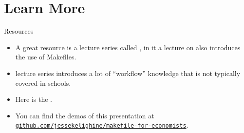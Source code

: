 \documentclass{beamer}
\begin{document}
\section{Learn More}

\begin{frame}{Resources}
	\begin{itemize}
		\item
			A great resource is a lecture series called \href{https://missing.csail.mit.edu/}{},
			in it a lecture on \href{https://missing.csail.mit.edu/2020/metaprogramming/}{} also introduces the use of Makefiles.
		\item
			\href{https://missing.csail.mit.edu/}{}
			lecture series introduces a lot of ``workflow'' knowledge that is not typically covered in schools.
		\item
			Here is the \href{https://www.gnu.org/software/make/manual/make.html}{}.
		\item
			You can find the demos of this presentation at \href{https://github.com/jessekelighine/makefile-for-economists}{\texttt{github.com/jessekelighine/makefile-for-economists}}.
	\end{itemize}
\end{frame}
\end{document}
